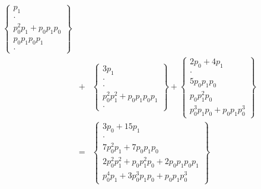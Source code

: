 \documentclass[a4paper,12pt]{article}
\numberwithin{definition}{section}
\numberwithin{lemma}{section}
\numberwithin{proposition}{section}
\numberwithin{theorem}{section}
\numberwithin{grammar}{section}
\numberwithin{program}{section}
\numberwithin{convention}{section}
\numberwithin{corollary}{section}
\numberwithin{principle}{section}
\begin{document}
$$\begin{array}{lcl}
          \begin{Bmatrix} p_1 \\ \cdot \\  p_0^2 p_1  + p_0 p_1 p_0 \\  p_0 p_1 p_0 p_1 \\ \cdot \end{Bmatrix}
          \\
    & + & \begin{Bmatrix} 3 p_1 \\ \cdot \\ \cdot \\ p_0^2 p_1^2 + p_0 p_1 p_0 p_1 \\ \cdot \end{Bmatrix} +
          \begin{Bmatrix} 2 p_0 + 4 p_1 \\ \cdot \\ 5 p_0 p_1 p_0 \\ p_0 p_1^2 p_0 \\ p_0^3 p_1 p_0 + p_0 p_1 p_0^3 \end{Bmatrix}
          \\
    & = & \begin{Bmatrix} 3 p_0 + 15 p_1 \\ \cdot \\ 7 p_0^2 p_1 + 7 p_0 p_1 p_0 \\ 2 p_0^2 p_1^2 + p_0 p_1^2 p_0 + 2 p_0 p_1 p_0 p_1 \\ p_0^4 p_1 + 3 p_0^3 p_1 p_0 + p_0 p_1 p_0^3 \end{Bmatrix}
\end{array}
$$
\end{document}

